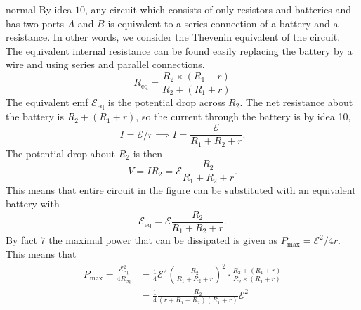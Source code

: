 \begin{solution}{normal}
By idea $10$, any circuit which consists of only resistors and batteries and has two ports $A$ and $B$ is equivalent to a series connection of a battery and a resistance. In other words, we consider the Thevenin equivalent of the circuit. The equivalent internal resistance can be found easily replacing the battery by a wire and using series and parallel connections.
$$R_{\text{eq}} = \frac{R_2\times (R_1+r)}{R_2 + (R_1+r)}$$The equivalent emf $\mathcal{E}_{\text{eq}}$ is the potential drop across $R_2$. The net resistance about the battery is $R_2 + (R_1+r)$, so the current through the battery is by idea 10,
\[ I = \mathcal{E}/r\implies I = \frac{\mathcal{E}}{R_1+R_2+r}.\]The potential drop about $R_2$ is then
\[V = IR_2 = \mathcal{E}\frac{R_2}{R_1+R_2+r}.\]This means that entire circuit in the figure can be substituted with an equivalent battery with
$$\mathcal{E}_{\text{eq}} = \mathcal{E}\frac{R_2}{R_1+R_2+r}.$$By fact $7$ the maximal power that can be dissipated is given as $P_{\text{max}} = \mathcal{E}^2/4r$. This means that
\begin{align*}
P_{\text{max}} = \frac{\mathcal{E}_{\text{eq}}^2}{4R_{\text{eq}}} &= \frac{1}{4}\mathcal{E}^2 \left(\frac{R_2}{R_1+R_2+r}\right)^2 \cdot \frac{R_2 + (R_1+r)}{R_2\times (R_1+r)} \\
&= \frac{1}{4}\frac{R_2}{(r + R_1 + R_2)(R_1 + r)}\mathcal{E}^2
\end{align*}
\end{solution}